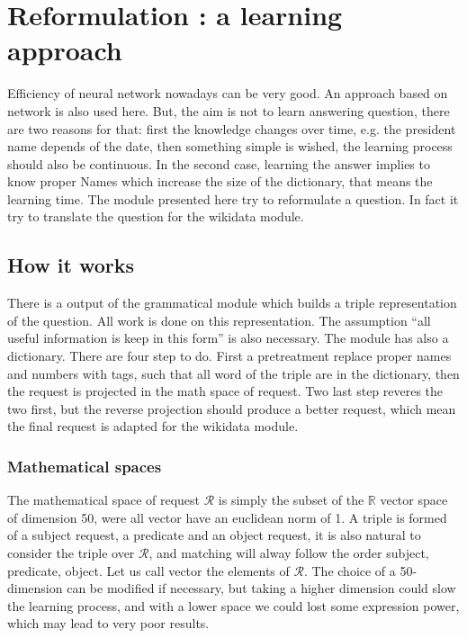 \section{Reformulation : a learning approach }

Efficiency of neural network nowadays can be very good. An approach based on network is also used here. But, the aim is not to learn answering question, there are two reasons for that: first the knowledge changes over time, e.g. the president name depends of the date, then something simple is wished, the learning process should also be continuous. In the second case, learning the answer implies to know proper Names which increase the size of the dictionary, that means the learning time. The module presented here try to reformulate a question. In fact it try to translate the question for the wikidata module.

\subsection{How it works}

There is a output of the grammatical module which builds a triple representation of the question. All work is done on this representation. The assumption ``all useful information is keep in this form''  is also necessary. The module has also a dictionary. There are four step to do. First a pretreatment replace proper names and numbers with tags, such that all word of the triple are in the dictionary, then the request is projected in the math space of request. Two last step reveres the two first, but the reverse projection should produce a better request, which mean the final request is adapted for the wikidata module.

\subsubsection{Mathematical spaces}

The mathematical space of request $\mathcal{R}$ is simply the subset of the $\mathbb{R}$ vector space of dimension 50, were all vector have an euclidean norm of 1.
A triple is formed of a subject request, a predicate and an object request, it is also natural to consider the triple over $\mathcal{R}$, and matching will alway follow the order subject, predicate, object.
Let us call vector the elements of $\mathcal{R}$.
The choice of a 50-dimension can be modified if necessary, but taking a higher dimension could slow the learning process, and with a lower space we could lost some expression power, which may lead to very poor results.

